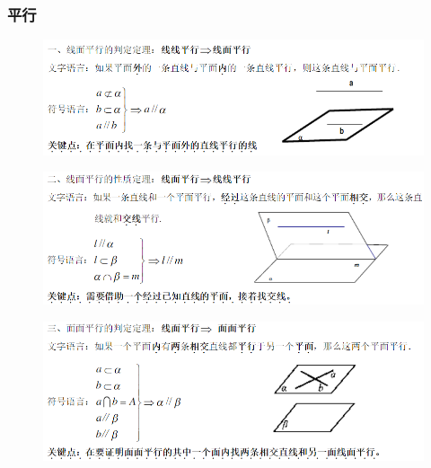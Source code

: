 \documentclass[hyperref, UTF8,11pt,a4paper]{ctexart} %
\begin{document}
\iffalse

	\subsubsection{平行}
	\begin{figure}[!h] %
		\centering
		\includegraphics[width=450pt]  {pic/litijihe/xmpxpd.png} \\
	\end{figure}
	\begin{figure}[!h] %
		\centering
		\includegraphics[width=450pt]  {pic/litijihe/xmpxxz.png} \\

	\end{figure}
	\begin{figure}[!h] %
		\centering
		\includegraphics[width=450pt]  {pic/litijihe/mmpxpd.png} \\

	\end{figure}
\end{document}
